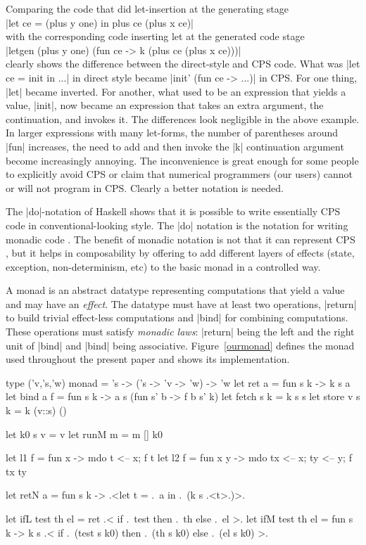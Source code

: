 \documentclass{llncs}
\begin{document}
Comparing the code that did let-insertion at the generating stage\\
|let ce = (plus y one) in  plus ce (plus x ce)|\\
with the corresponding code inserting let at the generated code stage\\
|letgen (plus y one) (fun ce -> k (plus ce (plus x ce)))|\\
clearly shows the difference between the direct-style and CPS code.
What was |let ce = init in ...| in direct style became
|init' (fun ce -> ...)| in CPS. For one thing, |let| became
inverted. For another, what used to be an expression that yields
a value, |init|, now became an expression that takes an extra argument,
the continuation, and invokes it. The differences look negligible in
the above example. In larger expressions with many let-forms, the
number of parentheses around |fun| increases, the need to add and
then invoke the |k| continuation argument become increasingly annoying. The
inconvenience is great enough for some people to explicitly avoid CPS
or claim that numerical programmers (our users) cannot or will not
program in CPS. Clearly a better notation is needed.

The |do|-notation of Haskell \cite{Haskell98Report} shows that it is possible
to write essentially CPS code in conventional-looking style. The
|do| notation is the notation for writing monadic code \cite{moggi-notions}.
The benefit of monadic notation is not that it can represent CPS \cite{Filinski:Representing}, but it helps in composability by offering to add different
layers of effects (state, exception, non-determinism, etc) to the
basic monad \cite{liang-interpreter} in a controlled way.

A monad \cite{moggi-notions} is an abstract datatype representing
computations that yield a value and may have an \emph{effect}.
The datatype must have at least two operations, |return| to build
trivial effect-less computations and |bind| for combining
computations. These operations must satisfy \emph{monadic laws}:
|return| being the left and the right unit of |bind| and |bind| being
associative. Figure~\ref{ourmonad} defines the monad used throughout
the present paper and shows its implementation.

\begin{figure*}\label{ourmonad}
\begin{code}
type ('v,'s,'w) monad = 's -> ('s -> 'v -> 'w) -> 'w
let ret a = fun s k -> k s a
let bind a f = fun s k -> a s (fun s' b -> f b s' k)
let fetch s k = k s s
let store v s k = k (v::s) ()

let k0 s v = v
let runM m = m [] k0

let l1 f = fun x -> mdo { t <-- x; f t}
let l2 f = fun x y -> mdo { tx <-- x; ty <-- y; f tx ty}

let retN a = fun s k -> .<let t = .~a in .~(k s .<t>.)>.

let ifL test th el = ret .< if .~test then .~th else .~el >.
let ifM test th el = fun s k ->
  k s .< if .~(test s k0) then .~(th s k0) else .~(el s k0) >.
\end{code}
\caption{Our monad}
\end{figure*}
\end{document}
